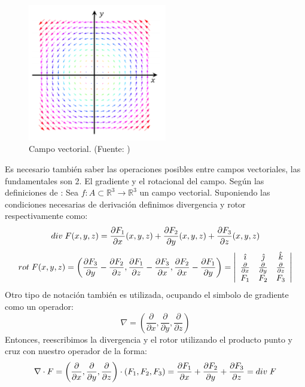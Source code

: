 \documentclass[11pt]{article}
\begin{document}
\begin{figure}[H]
\centering
\includegraphics[height=6cm]{Imagenes/campoveccolor.png}
\caption{Campo vectorial. (Fuente: \cite{camposvectoriales})}\label{fig:Campo vectorial en colores}
\end{figure}
Es necesario también saber las operaciones posibles entre campos vectoriales, las fundamentales son 2. El gradiente y el rotacional del campo. Según las definiciones de \cite{camposvectoriales2}:
Sea $f:A\subset \mathbb{R}^3\rightarrow \mathbb{R}^3$ un campo vectorial. Suponiendo las condiciones necesarias de derivación definimos divergencia y rotor respectivamente como:
\begin{equation*} 
\mathnormal{div}\;F(x,y,z)=\frac{\partial F_1}{\partial x}(x,y,z)+\frac{\partial F_2}{\partial y}(x,y,z)+\frac{\partial F_3}{\partial z}(x,y,z)
\end{equation*}
\begin{equation*}
\mathnormal{rot}\;F(x,y,z)=\left(\frac{\partial F_3}{\partial y}-\frac{\partial F_2}{\partial z},\frac{\partial F_1}{\partial z}-\frac{\partial F_3}{\partial x},\frac{\partial F_2}{\partial x}-\frac{\partial F_1}{\partial y}\right)=  \left| {\begin{array}{ccc}
   \hat{\imath} & \hat{\jmath} & \hat{k} \\
   \frac{\partial}{\partial x} & \frac{\partial}{\partial y} & \frac{\partial}{\partial z} \\
   F_1 & F_2 & F_3 \\
  \end{array} } \right|
\end{equation*}
Otro tipo de notación también es utilizada, ocupando el simbolo de gradiente como un operador:
$$\nabla = \left(\frac{\partial}{\partial x},\frac{\partial}{\partial y},\frac{\partial}{\partial z}\right)$$
Entonces, reescribimos la divergencia y el rotor utilizando el producto punto y cruz con nuestro operador de la forma:
$$\nabla \cdot F = \left(\frac{\partial}{\partial x},\frac{\partial}{\partial y},\frac{\partial}{\partial z}\right) \cdot \left(F_1,F_2,F_3\right)=\frac{\partial F_1}{\partial x}+\frac{\partial F_2}{\partial y}+\frac{\partial F_3}{\partial z}=\mathnormal{div}\;F$$
\end{document}
